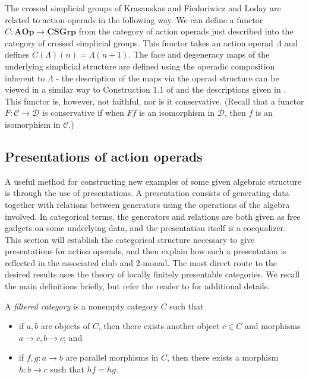 \begin{rem}\label{rem:crossed}
The crossed simplicial groups of Krasauskas \cite{Kra87} and Fiedoriwicz and Loday \cite{FL91} are related to action operads in the following way. We can define a functor $C \colon \mathbf{AOp} \rightarrow \mathbf{CSGrp}$ from the category of action operads just described into the category of crossed simplicial groups. This functor takes an action operad $\Lambda$ and defines $C(\Lambda)(n) = \Lambda(n+1)$. The face and degeneracy maps of the underlying simplicial structure are defined using the operadic composition inherent to $\Lambda$ - the description of the maps via the operad structure can be viewed in a similar way to Construction 1.1 of \cite{Kra96} and the descriptions given in \cite{ber-simplicial}. This functor is, however, not faithful, nor is it conservative. (Recall that a functor $F \colon \mathcal{C} \rightarrow \mathcal{D}$ is conservative if when $Ff$ is an isomorphism in $\mathcal{D}$, then $f$ is an isomorphism in $\mathcal{C}$.)
\end{rem}

\subsection{Presentations of action operads}\label{sec:presofacops}
A useful method for constructing new examples of some given algebraic structure is through the use of presentations. A presentation consists of generating data together with relations between generators using the operations of the algebra involved. In categorical terms, the generators and relations are both given as free gadgets on some underlying data, and the presentation itself is a coequalizer. This section will establish the categorical structure necessary to give presentations for action operads, and then explain how such a presentation is reflected in the associated club and $2$-monad. The most direct route to the desired results uses the theory of locally finitely presentable categories. We recall the main definitions briefly, but refer the reader to \cite{ar} for additional details.

\begin{Defi}\label{def:filtered}
  A \textit{filtered category} is a nonempty category $C$ such that
    \begin{itemize}
      \item if $a,b$ are objects of $C$, then there exists another object $c \in C$ and morphisms $a \rightarrow c, b \rightarrow c$; and
      \item if $f,g \colon a \rightarrow b$ are parallel morphisms in $C$, then there exists a morphism $h \colon b \rightarrow c$ such that $hf = hg$.
    \end{itemize}
\end{Defi}

